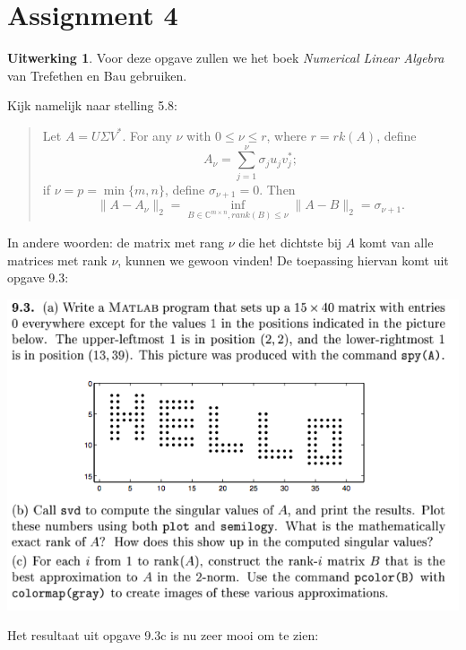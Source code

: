 \documentclass[11pt]{amsart}
\theoremstyle{definition}
\newtheorem*{uitwerking}{Uitwerking}
\newcommand{\C}{\mathbb{C}}
\begin{document}
\section*{Assignment 4}
\begin{uitwerking}
  Voor deze opgave zullen we het boek \emph{Numerical Linear Algebra} van Trefethen en Bau gebruiken.

  Kijk namelijk naar stelling 5.8:
  \begin{quote}
    Let $A = U \Sigma V^*$. For any $\nu$ with $0 \leq \nu \leq r$, where $r = rk(A)$, define
    \[
    A_\nu = \sum_{j=1}^\nu \sigma_j u_j v_j^*;
    \]
    if $\nu = p = \min{\{m,n\}}$, define $\sigma_{\nu + 1} = 0$. Then
    \[
    \| A - A_\nu \|_2 = \inf_{B \in \C^{m \times n}, rank(B) \leq \nu} \| A - B \|_2 = \sigma_{\nu + 1}.
    \]
  \end{quote}
  In andere woorden: de matrix met rang $\nu$ die het dichtste bij $A$ komt van alle matrices met rank $\nu$, kunnen we gewoon vinden! De toepassing hiervan komt uit opgave 9.3:

  \includegraphics[width=\textwidth]{bla.png}

  Het resultaat uit opgave 9.3c is nu zeer mooi om te zien:


\end{uitwerking}
\end{document}
